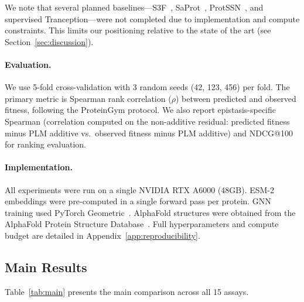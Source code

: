 \documentclass{article}
\newcommand{\spearman}{\rho}
\begin{document}
We note that several planned baselines---S3F~\citep{zhang2024multiscale}, SaProt~\citep{su2024saprot}, ProtSSN~\citep{tan2023semantical}, and supervised Tranception---were not completed due to implementation and compute constraints. This limits our positioning relative to the state of the art (see Section~\ref{sec:discussion}).

\paragraph{Evaluation.} We use 5-fold cross-validation with 3 random seeds (42, 123, 456) per fold. The primary metric is Spearman rank correlation ($\spearman$) between predicted and observed fitness, following the ProteinGym protocol. We also report epistasis-specific Spearman (correlation computed on the non-additive residual: predicted fitness minus PLM additive vs.\ observed fitness minus PLM additive) and NDCG@100 for ranking evaluation.

\paragraph{Implementation.} All experiments were run on a single NVIDIA RTX A6000 (48GB). ESM-2 embeddings were pre-computed in a single forward pass per protein. GNN training used PyTorch Geometric~\citep{fey2019fast}. AlphaFold structures were obtained from the AlphaFold Protein Structure Database~\citep{jumper2021highly}. Full hyperparameters and compute budget are detailed in Appendix~\ref{app:reproducibility}.

\subsection{Main Results}
\label{sec:main_results}

Table~\ref{tab:main} presents the main comparison across all 15 assays.
\end{document}
